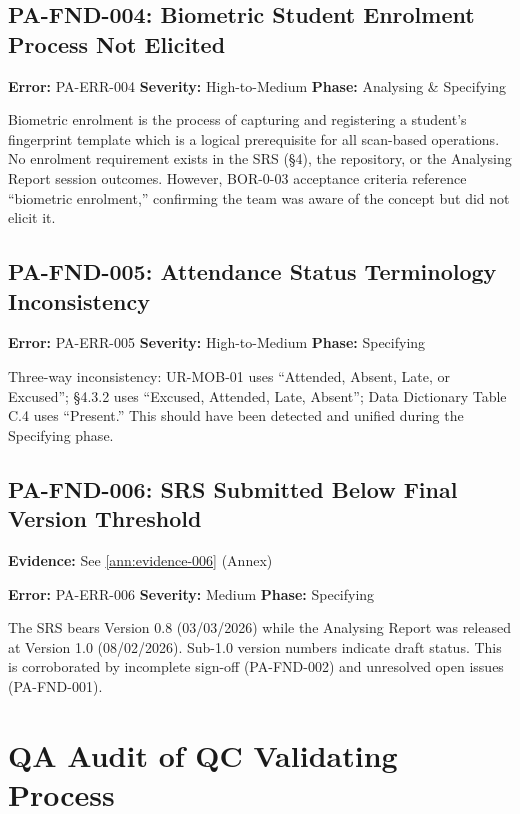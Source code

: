 \documentclass[11pt,a4paper]{article}
\begin{document}
\subsection{PA-FND-004: Biometric Student Enrolment Process Not Elicited}

\noindent\textbf{Error:} PA-ERR-004 \quad \textbf{Severity:} High-to-Medium \quad \textbf{Phase:} Analysing \& Specifying

Biometric enrolment is the process of capturing and registering a student's fingerprint template which is a logical prerequisite for all scan-based operations. No enrolment requirement exists in the SRS (\S4), the repository, or the Analysing Report session outcomes. However, BOR-0-03 acceptance criteria reference ``biometric enrolment,'' confirming the team was aware of the concept but did not elicit it.

\subsection{PA-FND-005: Attendance Status Terminology Inconsistency}

\noindent\textbf{Error:} PA-ERR-005 \quad \textbf{Severity:} High-to-Medium \quad \textbf{Phase:} Specifying

Three-way inconsistency: UR-MOB-01 uses ``Attended, Absent, Late, or Excused''; \S4.3.2 uses ``Excused, Attended, Late, Absent''; Data Dictionary Table C.4 uses ``Present.'' This should have been detected and unified during the Specifying phase.

\subsection{PA-FND-006: SRS Submitted Below Final Version Threshold}

\noindent\textbf{Evidence:} See \ref{ann:evidence-006} (Annex)

\noindent\textbf{Error:} PA-ERR-006 \quad \textbf{Severity:} Medium \quad \textbf{Phase:} Specifying

The SRS bears Version 0.8 (03/03/2026) while the Analysing Report was released at Version 1.0 (08/02/2026). Sub-1.0 version numbers indicate draft status. This is corroborated by incomplete sign-off (PA-FND-002) and unresolved open issues (PA-FND-001).

\section{QA Audit of QC Validating Process}
\label{sec:qc-audit}
\end{document}
